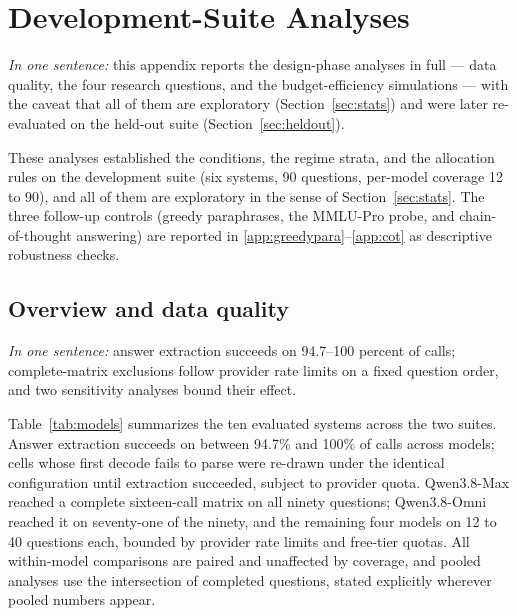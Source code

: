 \section{Development-Suite Analyses}
\setcounter{table}{0}
\label{app:dev}
\label{sec:results}

\emph{In one sentence:} this appendix reports the design-phase analyses in full --- data quality, the four research questions, and the budget-efficiency simulations --- with the caveat that all of them are exploratory (Section~\ref{sec:stats}) and were later re-evaluated on the held-out suite (Section~\ref{sec:heldout}).

These analyses established the conditions, the regime strata, and the allocation rules on the development suite (six systems, 90 questions, per-model coverage 12 to 90), and all of them are exploratory in the sense of Section~\ref{sec:stats}. The three follow-up controls (greedy paraphrases, the MMLU-Pro probe, and chain-of-thought answering) are reported in \ref{app:greedypara}--\ref{app:cot} as descriptive robustness checks.

\subsection{Overview and data quality}
\label{app:overview}
\label{sec:overview}

\emph{In one sentence:} answer extraction succeeds on 94.7--100 percent of calls; complete-matrix exclusions follow provider rate limits on a fixed question order, and two sensitivity analyses bound their effect.

Table~\ref{tab:models} summarizes the ten evaluated systems across the two suites. Answer extraction succeeds on between 94.7\% and 100\% of calls across models; cells whose first decode fails to parse were re-drawn under the identical configuration until extraction succeeded, subject to provider quota. Qwen3.8-Max reached a complete sixteen-call matrix on all ninety questions; Qwen3.8-Omni reached it on seventy-one of the ninety, and the remaining four models on 12 to 40 questions each, bounded by provider rate limits and free-tier quotas. All within-model comparisons are paired and unaffected by coverage, and pooled analyses use the intersection of completed questions, stated explicitly wherever pooled numbers appear.

\begin{table}[htbp]
\centering
\small
\caption{Main results on the development suite. Accuracy (\%) under budget-matched conditions: greedy single call at $\tau{=}0$, single-sample expectation S1 (mean over the six canonical draws at $\tau{=}0.7$), six-vote self-consistency (SC-6), six-paraphrase ensemble (PE-6), three-paraphrase two-sample hybrid (HB-6), and the twelve-vote combined ensemble (COMB-12). $\Delta$SC and $\Delta$PE are the gains of SC-6 and PE-6 over the S1 baseline in points.}
\label{tab:main}

\end{table}

